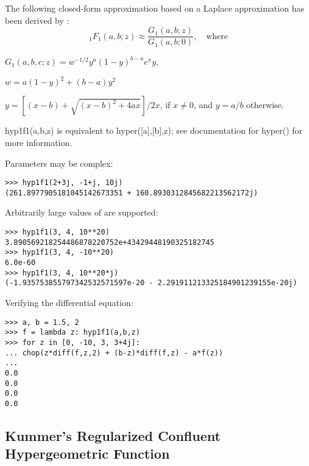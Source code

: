 The following closed-form approximation based on a Laplace approximation has been derived by \cite{Butler_Wood_2002}:
\begin{equation}
{}_1{F}_1(a,b;z)  \approx  \frac{G_1(a,b;z)}{G_1(a,b;0)}, \quad \text{where}
\end{equation}
\begin{center}
	$G_1(a,b,c;z) = w^{-1/2} y^a (1-y)^{b-a} e^xy$,
	
	\vspace{0.3cm}
	$w = a(1-y)^2 + (b-a)y^2$
	
	\vspace{0.3cm}
	$y = [(x-b) + \sqrt{(x-b)^2 + 4ax}] / 2x$, if $x \neq 0$, and $y=a/b$ otherwise.
\end{center}





\vpara
hyp1f1(a,b,z) is equivalent to hyper([a],[b],z); see documentation for hyper() for more information.

Parameters may be complex:

\begin{lstlisting}
>>> hyp1f1(2+3j, -1+j, 10j)
(261.8977905181045142673351 + 160.8930312845682213562172j)
\end{lstlisting}

Arbitrarily large values of are supported:

\begin{lstlisting}
>>> hyp1f1(3, 4, 10**20)
3.890569218254486878220752e+43429448190325182745
>>> hyp1f1(3, 4, -10**20)
6.0e-60
>>> hyp1f1(3, 4, 10**20*j)
(-1.935753855797342532571597e-20 - 2.291911213325184901239155e-20j)
\end{lstlisting}

Verifying the differential equation:

\begin{lstlisting}
>>> a, b = 1.5, 2
>>> f = lambda z: hyp1f1(a,b,z)
>>> for z in [0, -10, 3, 3+4j]:
... chop(z*diff(f,z,2) + (b-z)*diff(f,z) - a*f(z))
...
0.0
0.0
0.0
0.0
\end{lstlisting}



\subsection{Kummer's Regularized Confluent Hypergeometric Function}
\label{Hypergeometric1F1RegularizedMpMath}


